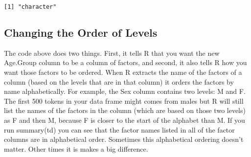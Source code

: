 \documentclass[
  12pt,
  letterpaper]{article}
\newenvironment{Shaded}{\begin{snugshade}}{\end{snugshade}}
\newcommand{\AttributeTok}[1]{\textcolor[rgb]{0.40,0.45,0.13}{#1}}
\newcommand{\FunctionTok}[1]{\textcolor[rgb]{0.28,0.35,0.67}{#1}}
\newcommand{\NormalTok}[1]{\textcolor[rgb]{0.00,0.23,0.31}{#1}}
\newcommand{\OtherTok}[1]{\textcolor[rgb]{0.00,0.23,0.31}{#1}}
\newcommand{\SpecialCharTok}[1]{\textcolor[rgb]{0.37,0.37,0.37}{#1}}
\newcommand{\StringTok}[1]{\textcolor[rgb]{0.13,0.47,0.30}{#1}}
\renewcommand\texttt[1]{{\ttfamily\color{BrickRed}#1}}
\begin{document}
\begin{verbatim}
[1] "character"
\end{verbatim}

\hypertarget{changing-the-order-of-levels}{%
\subsection{Changing the Order of
Levels}\label{changing-the-order-of-levels}}

\begin{Shaded}
\end{Shaded}

The code above does two things. First, it tells \texttt{R} that you want
the new \texttt{Age.Group} column to be a column of factors, and second,
it also tells \texttt{R} how you want those factors to be ordered. When
\texttt{R} extracts the name of the factors of a column (based on the
levels that are in that column) it orders the factors by name
alphabetically. For example, the \texttt{Sex} column contains two
levels: \texttt{M} and \texttt{F}. The first 500 tokens in your data
frame might comes from males but \texttt{R} will still list the names of
the factors in the column (which are based on those two levels) as
\texttt{F} and then \texttt{M}, because \texttt{F} is closer to the
start of the alphabet than \texttt{M}. If you run \texttt{summary(td)}
you can see that the factor names listed in all of the factor columns
are in alphabetical order. Sometimes this alphabetical ordering doesn't
matter. Other times it is makes a big difference.
\end{document}
